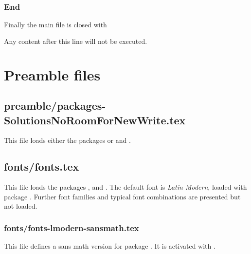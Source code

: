 \subsection{End}
\label{sec:document:end}

Finally the main file is closed with 

Any content after this line will not be executed.

\chapter{Preamble files}

\section{preamble/packages-SolutionsNoRoomForNewWrite.tex}

This file loads either the packages  or  and
. 


\section{fonts/fonts.tex}

This file loads the packages ,  and
. The default font is \emph{Latin Modern}, loaded with package . Further font families and typical font combinations 
are presented but not loaded.


\subsection{fonts/fonts-lmodern-sansmath.tex}

This file defines a sans math version for package . 
It is activated with .

